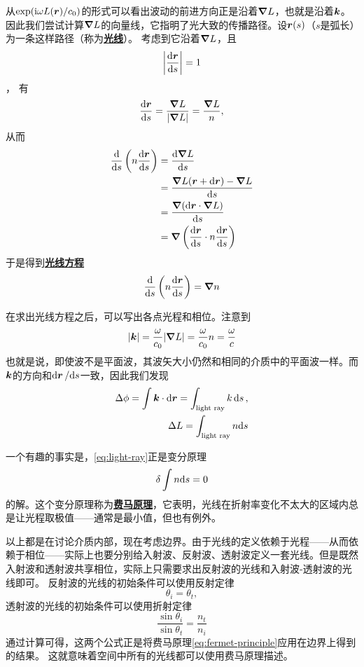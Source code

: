 \documentclass[UTF8, a4paper]{ctexart}
\newcommand*{\ii}{\mathrm{i}}
\newcommand*{\concept}[1]{\underline{\textbf{#1}}}
\begin{document}
从$\exp (\ii \omega L(\vb*{r}) / c_0)$的形式可以看出波动的前进方向正是沿着$\grad{L}$，也就是沿着$\vb*{k}$。
因此我们尝试计算$\grad{L}$的向量线，它指明了光大致的传播路径。设$\vb*{r}(s)$（$s$是弧长）为一条这样路径（称为\concept{光线}）。
考虑到它沿着$\grad{L}$，且
\[
    \abs{\dv{\vb*{r}}{s}} = 1
\]，
有
\[
    \dv{\vb*{r}}{s} = \frac{\grad{L}}{\abs{\grad{L}}} = \frac{\grad{L}}{n},
\]
从而
\[
    \begin{aligned}
        \dv{s}\left(n \dv{\vb*{r}}{s}\right) &= \dv{\grad{L}}{s} \\
        &= \frac{\grad{L}(\vb*{r} + \dd \vb*{r}) - \grad{L}}{\dd s} \\
        &= \frac{\grad{(\dd \vb*{r} \cdot \grad{L})}}{\dd s} \\
        &= \grad{\left( \dv{\vb*{r}}{s} \cdot n \dv{\vb*{r}}{s} \right)}
    \end{aligned}
\]
于是得到\concept{光线方程}
\begin{equation}
    \dv{s} \left( n \dv{\vb*{r}}{s} \right) = \grad{n}
    \label{eq:light-ray}
\end{equation}

在求出光线方程之后，可以写出各点光程和相位。注意到
\[
    \abs{\vb*{k}} = \frac{\omega}{c_0} \abs{\grad{L}} = \frac{\omega}{c_0} n = \frac{\omega}{c}
\]
也就是说，即使波不是平面波，其波矢大小仍然和相同的介质中的平面波一样。而$\vb*{k}$的方向和$\dd{\vb*{r}} / \dd s$一致，因此我们发现
\begin{equation}
    \begin{split}
        \Delta \phi = \int \vb*{k} \cdot \dd{\vb*{r}} = \int_\text{light ray} k \dd{s}, \\
        \Delta L = \int_\text{light ray} n \dd s
    \end{split}
    \label{eq:light-ray-and-phrase}
\end{equation}

一个有趣的事实是，\eqref{eq:light-ray}正是变分原理
\begin{equation}
    \var \int n \dd s = 0
    \label{eq:fermet-principle}
\end{equation}
的解。这个变分原理称为\concept{费马原理}，它表明，光线在折射率变化不太大的区域内总是让光程取极值——通常是最小值，但也有例外。

以上都是在讨论介质内部，现在考虑边界。由于光线的定义依赖于光程——从而依赖于相位——实际上也要分别给入射波、反射波、透射波定义一套光线。但是既然入射波和透射波共享相位，实际上只需要求出反射波的光线和入射波-透射波的光线即可。
反射波的光线的初始条件可以使用反射定律
\[
    \theta_i = \theta_t,
\]
透射波的光线的初始条件可以使用折射定律
\[
    \frac{\sin \theta_i}{\sin \theta_t} = \frac{n_t}{n_i}
\]
通过计算可得，这两个公式正是将费马原理\eqref{eq:fermet-principle}应用在边界上得到的结果。
这就意味着空间中所有的光线都可以使用费马原理描述。
\end{document}
